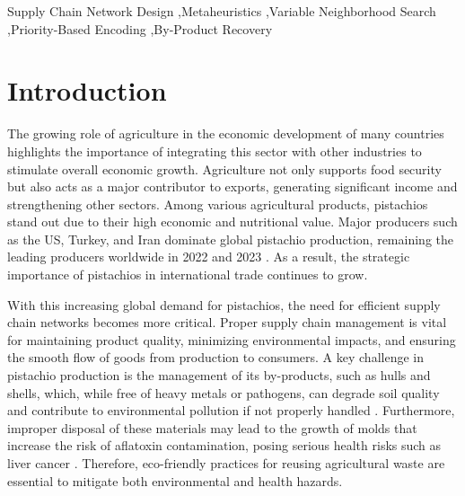 \documentclass[preprint,12pt,authoryear]{elsarticle}
\begin{document}
\begin{frontmatter}
\begin{keyword}
Supply Chain Network Design \sep Metaheuristics \sep Variable Neighborhood Search \sep Priority-Based Encoding \sep By-Product Recovery
\end{keyword}

\end{frontmatter}


\section{Introduction}
\label{sec:intro}

The growing role of agriculture in the economic development of many countries highlights the importance of integrating this sector with 
other industries to stimulate overall economic growth. Agriculture not only supports food security but also acts as a major contributor 
to exports, generating significant income and strengthening other sectors. Among various agricultural products, pistachios stand out due to 
their high economic and nutritional value. Major producers such as the US, Turkey, and Iran dominate global pistachio production, 
remaining the leading producers worldwide in 2022 and 2023 \citep{statista2023}. As a result, the strategic importance of pistachios in international trade continues to grow.

With this increasing global demand for pistachios, the need for efficient supply chain networks becomes more critical. Proper supply chain 
management is vital for maintaining product quality, minimizing environmental impacts, and ensuring the smooth flow of goods from production 
to consumers. A key challenge in pistachio production is the management of its by-products, such as hulls and shells, which, while free of heavy 
metals or pathogens, can degrade soil quality and contribute to environmental pollution if not properly handled \citep{doula2014, bartzas2017}. 
Furthermore, improper disposal of these materials may lead to the growth of molds that increase the risk of aflatoxin contamination, posing serious 
health risks such as liver cancer \citep{hokmabadi2018,dronavalli2019}. Therefore, eco-friendly practices for reusing agricultural waste are 
essential to mitigate both environmental and health hazards.
\end{document}
